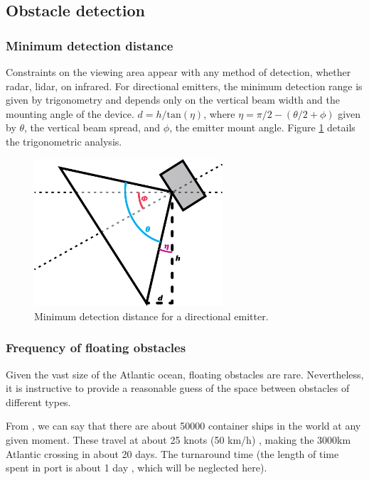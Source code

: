 \appendix
\renewcommand{\thesubsection}{\Alph{subsection}}
\renewcommand{\thesubsubsection}{\thesubsection.\arabic{subsubsection}}
\subsection{\label{app:AppendixA}Obstacle detection} 

\subsubsection{\label{app:minimum-detection-distance}Minimum detection distance}
Constraints on the viewing area appear with any method of detection, whether radar, lidar, on infrared. For directional emitters, the minimum detection range is given by trigonometry and depends only on the vertical beam width and the mounting angle of the device. $d = h/\text{tan}(\eta)$, where $\eta=\pi/2-(\theta/2+\phi)$ given by $\theta$, the vertical beam spread, and $\phi$, the emitter mount angle. Figure \ref{fig:emitter-angle} details the trigonometric analysis.
\begin{figure}
\includegraphics[width=70mm,natwidth=505,natheight=394]{"./image/directional-emitters"}
\caption[Minimum distance to detected obstacle.]{\label{fig:emitter-angle}Minimum detection distance for a directional emitter.}
\end{figure}


\subsubsection{\label{app:obstacle-frequency}Frequency of floating obstacles}
Given the vast size of the Atlantic ocean, floating obstacles are rare. Nevertheless, it is instructive to provide a reasonable guess of the space between obstacles of different types.

From \cite{jallal__how-many-ships}, we can say that there are about 50000 container ships in the world at any given moment. These travel at about 25 knots (50 km/h) \cite{maersk__triple-e-class}, making the 3000km Atlantic crossing in about 20 days. The turnaround time (the length of time spent in port is about 1 day \cite{port-technology__global-turnaround-times}, which will be neglected here).

